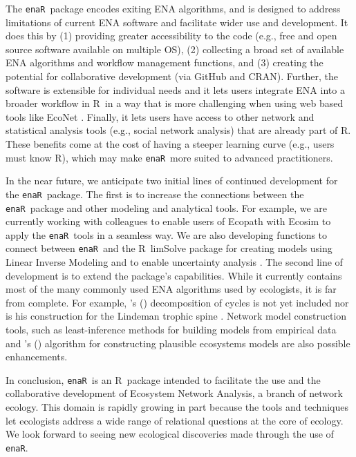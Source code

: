 \documentclass[11pt]{article}
\def\citeapos#1{\citeauthor{#1}'s (\citeyear{#1})}
\newcommand{\R}{R}
\newcommand{\enaR}{\texttt{enaR}}
\begin{document}
\begin{spacing}{2}
The \enaR\ package encodes exiting ENA algorithms, and is designed to
address limitations of current ENA software and facilitate wider
use and development. It does this by (1) providing greater
accessibility to the code (e.g., free and open source software
available on multiple OS), (2) collecting a broad set of available ENA
algorithms and workflow management functions, and (3) creating the
potential for collaborative development (via GitHub and CRAN).
Further, the software is extensible for individual needs and it lets
users integrate ENA into a broader workflow in \R\ in a way that is
more challenging when using web based tools like EcoNet
\citep{kazanci07,schramski11}.  Finally, it lets users have access to
other network and statistical analysis tools (e.g., social network
analysis) that are already part of \R.  These benefits come at the
cost of having a steeper learning curve (e.g., users must know \R ),
which may make \enaR\ more suited to advanced practitioners.

In the near future, we anticipate two initial lines of continued
development for the \enaR\ package. The first is to increase the
connections between the \enaR\ package and other modeling and
analytical tools.  For example, we are currently working with
colleagues to enable users of Ecopath with Ecosim
\citep{christensen04} to apply the \enaR\ tools in a seamless way.  We
are also developing functions to connect between \enaR\ and the \R\
limSolve package \citep{soetaert09} for creating models using Linear
Inverse Modeling and to enable uncertainty analysis
\citep{kones09}. The second line of development is to extend the
package's capabilities.  While it currently contains most of the many
commonly used ENA algorithms used by ecologists, it is far from
complete. For example, \citeapos{ulanowicz83} decomposition of cycles
is not yet included nor is his construction for the Lindeman trophic
spine \citep{ulanowicz1979trophic}. Network model construction
tools, such as least-inference methods for building models from
empirical data \citep{ulanowicz2008least} and \citeapos{fath04_cyber}
algorithm for constructing plausible ecosystems models are also
possible enhancements.

In conclusion, \enaR\ is an \R\ package intended to facilitate the use
and the collaborative development of Ecosystem Network Analysis, a
branch of network ecology.  This domain is rapidly growing in part
because the tools and techniques let ecologists address a wide range
of relational questions at the core of ecology.  We look forward to
seeing new ecological discoveries made through the use of \enaR.




\end{spacing}
\end{document}
